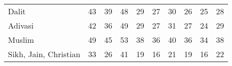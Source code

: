 \begin{tabular}{l*{9}{c}}
Dalit               &          43&          39&          48&          29&          27&          30&          26&          25&          28\\
Adivasi             &          42&          36&          49&          29&          27&          31&          27&          24&          29\\
Muslim              &          49&          45&          53&          38&          36&          40&          36&          34&          38\\
Sikh, Jain, Christian&          33&          26&          41&          19&          16&          21&          19&          16&          22\\
\bottomrule
\end{tabular}

